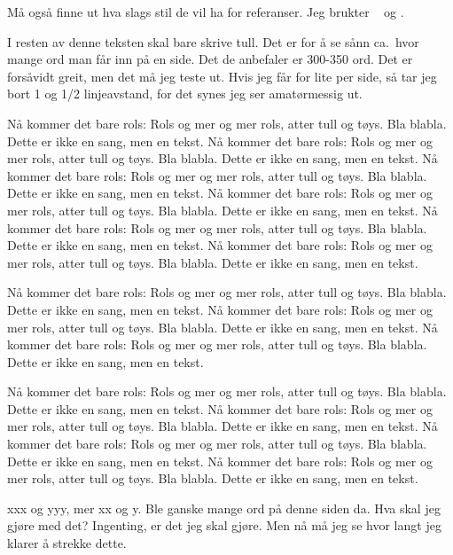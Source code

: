 \documentclass[a4paper,norsk,12pt]{report}
\begin{document}
  Må også finne ut hva slags stil de vil ha for referanser. Jeg
  brukter \cite{bessant}  og \cite{osterwalder}.

  I resten av denne teksten skal bare skrive tull. Det er for å se sånn
  ca.~hvor mange ord man får inn på en side. Det de anbefaler er 300-350 ord.
  Det er forsåvidt greit, men det må jeg teste ut. Hvis jeg får for lite per
  side, så tar jeg bort 1 og 1/2 linjeavstand, for det synes jeg ser
  amatørmessig ut.

  Nå kommer det bare rols: Rols og mer og mer rols, atter tull og tøys. Bla
  blabla. Dette er ikke en sang, men en tekst.
  Nå kommer det bare rols: Rols og mer og mer rols, atter tull og tøys. Bla
  blabla. Dette er ikke en sang, men en tekst.
  Nå kommer det bare rols: Rols og mer og mer rols, atter tull og tøys. Bla
  blabla. Dette er ikke en sang, men en tekst.
  Nå kommer det bare rols: Rols og mer og mer rols, atter tull og tøys. Bla
  blabla. Dette er ikke en sang, men en tekst.
  Nå kommer det bare rols: Rols og mer og mer rols, atter tull og tøys. Bla
  blabla. Dette er ikke en sang, men en tekst.
  Nå kommer det bare rols: Rols og mer og mer rols, atter tull og tøys. Bla
  blabla. Dette er ikke en sang, men en tekst.

  Nå kommer det bare rols: Rols og mer og mer rols, atter tull og tøys. Bla
  blabla. Dette er ikke en sang, men en tekst.
  Nå kommer det bare rols: Rols og mer og mer rols, atter tull og tøys. Bla
  blabla. Dette er ikke en sang, men en tekst.
  Nå kommer det bare rols: Rols og mer og mer rols, atter tull og tøys. Bla
  blabla. Dette er ikke en sang, men en tekst.

  Nå kommer det bare rols: Rols og mer og mer rols, atter tull og tøys. Bla
  blabla. Dette er ikke en sang, men en tekst.
  Nå kommer det bare rols: Rols og mer og mer rols, atter tull og tøys. Bla
  blabla. Dette er ikke en sang, men en tekst.
  Nå kommer det bare rols: Rols og mer og mer rols, atter tull og tøys. Bla
  blabla. Dette er ikke en sang, men en tekst.
  Nå kommer det bare rols: Rols og mer og mer rols, atter tull og tøys. Bla
  blabla. Dette er ikke en sang, men en tekst.

  xxx og yyy, mer xx og y. Ble ganske mange ord på denne siden da. Hva skal jeg
  gjøre med det? Ingenting, er det jeg skal gjøre. Men nå må jeg se hvor langt
  jeg klarer å strekke dette.

  
  
\end{document}
